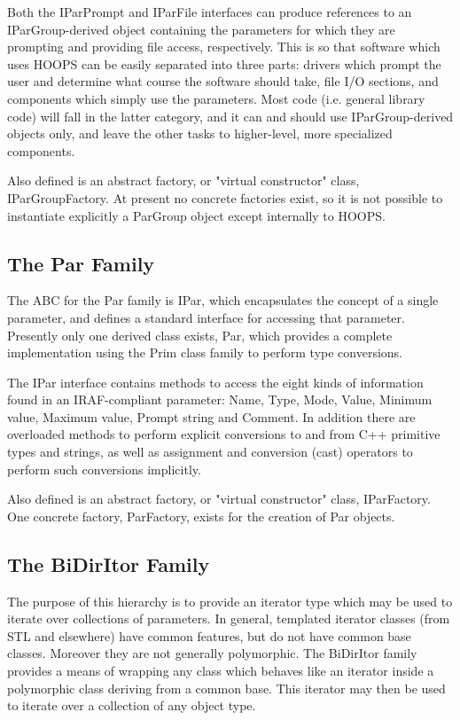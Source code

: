 Both the IParPrompt and IParFile interfaces can produce
references to an IParGroup-derived object containing
the parameters for which they are prompting and providing
file access, respectively. This is so that software
which uses HOOPS can be easily separated into three
parts: drivers which prompt the user and determine what
course the software should take, file I/O sections, and
components which simply use the parameters. Most code
(i.e. general library code) will fall in the latter category,
and it can and should use IParGroup-derived objects only,
and leave the other tasks to higher-level, more specialized
components.

Also defined is an abstract factory, or "virtual constructor"
class, IParGroupFactory. At present no concrete factories
exist, so it is not possible to instantiate explicitly
a ParGroup object except internally to HOOPS.

\subsection{The Par Family}
The ABC for the Par family is IPar, which encapsulates
the concept of a single parameter, and defines a standard
interface for accessing that parameter. Presently only
one derived class exists, Par, which provides a complete
implementation using the Prim class family to perform
type conversions.

The IPar interface contains methods to access the
eight kinds of information found in an IRAF-compliant
parameter: Name, Type, Mode, Value, Minimum value, Maximum
value, Prompt string and Comment. In addition there are
overloaded methods to perform explicit conversions to and
from C++ primitive types and strings, as well as assignment
and conversion (cast) operators to perform such conversions
implicitly.

Also defined is an abstract factory, or "virtual constructor"
class, IParFactory. One concrete factory, ParFactory,
exists for the creation of Par objects.

\subsection{The BiDirItor Family}
The purpose of this hierarchy is to provide an
iterator type which may be used to iterate over
collections of parameters. In general, templated
iterator classes (from STL and elsewhere) have common
features, but do not have common base classes. Moreover
they are not generally polymorphic. The BiDirItor family
provides a means of wrapping any class which behaves like
an iterator inside a polymorphic class deriving from a
common base. This iterator may then be used to iterate
over a collection of any object type.

